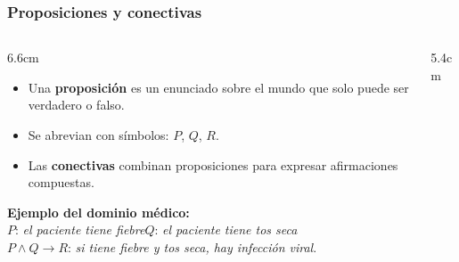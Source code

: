 \documentclass[aspectratio=169, 10pt]{beamer}
\begin{document}
\begin{frame}
\frametitle{Proposiciones y conectivas}
\begin{columns}[T]
\begin{column}{6.6cm}
\begin{itemize}
	\item Una \textbf{proposici\'on} es un enunciado sobre el mundo que solo puede ser verdadero o falso.
	\item Se abrevian con s\'imbolos: $P$, $Q$, $R$.
	\item Las \textbf{conectivas} combinan proposiciones para expresar afirmaciones compuestas.
\end{itemize}
\vspace{0.3em}
\footnotesize
\textbf{Ejemplo del dominio m\'edico:}\\
$P$: \emph{el paciente tiene fiebre}\qquad $Q$: \emph{el paciente tiene tos seca}\\
$P \land Q \rightarrow R$: \emph{si tiene fiebre y tos seca, hay infecci\'on viral}.
\end{column}
\begin{column}{5.4cm}
\begin{center}
\end{center}
\end{column}
\end{columns}
\end{frame}
\end{document}
